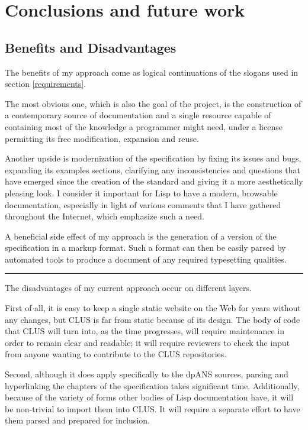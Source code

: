 \section{Conclusions and future work}

\subsection{Benefits and Disadvantages}

The benefits of my approach come as logical continuations of the slogans used in section \ref{requirements}.

The most obvious one, which is also the goal of the project, is the construction of a contemporary source of \cl{} documentation and a single resource capable of containing most of the knowledge a \cl{} programmer might need, under a license permitting its free modification, expansion and reuse.

Another upside is modernization of the specification by fixing its issues and bugs, expanding its examples sections, clarifying any inconsistencies and questions that have emerged since the creation of the standard and giving it a more aesthetically pleasing look. I consider it important for Lisp to have a modern, browsable documentation, especially in light of various comments that I have gathered throughout the Internet, which emphasize such a need.

A beneficial side effect of my approach is the generation of a version of the \cl{} specification in a markup format. Such a format can then be easily parsed by automated tools to produce a document of any required typesetting qualities.

\noindent\rule{\linewidth}{0.5pt}

The disadvantages of my current approach occur on different layers.

First of all, it is easy to keep a single static website on the Web for years without any changes, but CLUS is far from static because of its design. The body of code that CLUS will turn into, as the time progresses, will require maintenance in order to remain clear and readable; it will require reviewers to check the input from anyone wanting to contribute to the CLUS repositories.

Second, although it does apply specifically to the dpANS sources, parsing and hyperlinking the chapters of the specification takes significant time. Additionally, because of the variety of forms other bodies of Lisp documentation have, it will be non-trivial to import them into CLUS. It will require a separate effort to have them parsed and prepared for inclusion.

